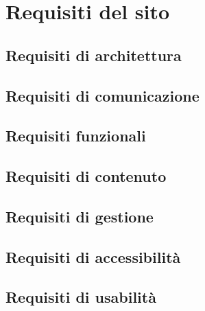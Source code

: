 
\chapter{Requisiti del sito}\label{chap:requisiti-del-sito}

\section{Requisiti di architettura}\label{sec:requisiti-di-architettura}

\section{Requisiti di comunicazione}\label{sec:requisiti-di-comunicazione}

\section{Requisiti funzionali}\label{sec:requisiti-funzionali}

\section{Requisiti di contenuto}\label{sec:requisiti-di-contenuto}

\section{Requisiti di gestione}\label{sec:requisiti-di-gestione}

\section{Requisiti di accessibilità}\label{sec:requisiti-di-accessibilita}

\section{Requisiti di usabilità}\label{sec:requisiti-di-usabilita}
